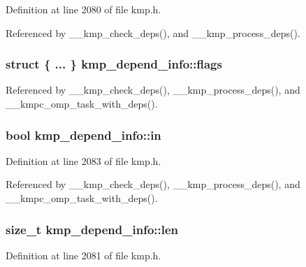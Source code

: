 Definition at line 2080 of file kmp.\-h.



Referenced by \-\_\-\-\_\-kmp\-\_\-check\-\_\-deps(), and \-\_\-\-\_\-kmp\-\_\-process\-\_\-deps().

\hypertarget{structkmp__depend__info_aa36eee45c425e2a66beb059660c9fb63}{
\subsubsection[{flags}]{\setlength{\rightskip}{0pt plus 5cm}struct \{ ... \}   kmp\-\_\-depend\-\_\-info\-::flags}}\label{structkmp__depend__info_aa36eee45c425e2a66beb059660c9fb63}


Referenced by \-\_\-\-\_\-kmp\-\_\-check\-\_\-deps(), \-\_\-\-\_\-kmp\-\_\-process\-\_\-deps(), and \-\_\-\-\_\-kmpc\-\_\-omp\-\_\-task\-\_\-with\-\_\-deps().

\hypertarget{structkmp__depend__info_a65b239cf11dd7d59dc86eb9ab5f6e414}{
\subsubsection[{in}]{\setlength{\rightskip}{0pt plus 5cm}bool kmp\-\_\-depend\-\_\-info\-::in}}\label{structkmp__depend__info_a65b239cf11dd7d59dc86eb9ab5f6e414}


Definition at line 2083 of file kmp.\-h.



Referenced by \-\_\-\-\_\-kmp\-\_\-check\-\_\-deps(), \-\_\-\-\_\-kmp\-\_\-process\-\_\-deps(), and \-\_\-\-\_\-kmpc\-\_\-omp\-\_\-task\-\_\-with\-\_\-deps().

\hypertarget{structkmp__depend__info_a432a5de100db7d4cb311366e88cc79b2}{
\subsubsection[{len}]{\setlength{\rightskip}{0pt plus 5cm}size\-\_\-t kmp\-\_\-depend\-\_\-info\-::len}}\label{structkmp__depend__info_a432a5de100db7d4cb311366e88cc79b2}


Definition at line 2081 of file kmp.\-h.

